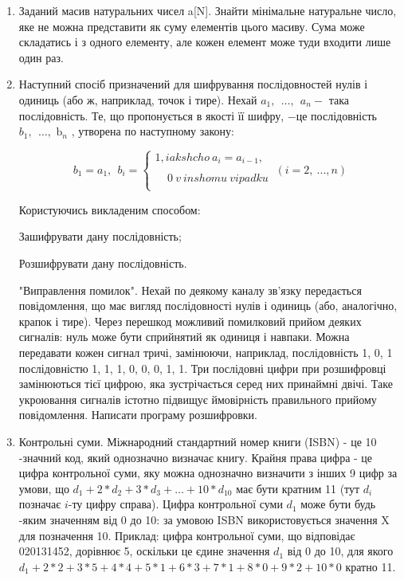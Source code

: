 \documentclass[]{article}
\begin{document}
\begin{enumerate}
\item
Заданий масив натуральних чисел a{[}N{]}. Знайти мінімальне натуральне
число, яке не можна представити як суму елементів цього масиву. Сума
може складатись і з одного елементу, але кожен елемент може туди входити
лише один раз.
\item
Наступний спосіб призначений для шифрування послідовностей нулів і
одиниць (або ж, наприклад, точок і тире). Нехай
\(a_{1},\ \ \ldots,\ \ a_{n} -\) така послідовність. Те, що пропонується
в якості її шифру, \(-\)це послідовність
\(b_{1},\ \ \ldots,\text{\ b}_{n}\) , утворена по наступному закону:


\[b_{1} = a_{1},\ \ b_{i} = \left\{ \begin{matrix}
1,iakshcho\ a_{i} = a_{i - 1}, \\
 \\
\ \ \ \ \ 0\ v\ inshomu\ vipadku \\
\end{matrix} \right.\ \left( i = 2,\ ...,n \right)\]


Користуючись викладеним способом:

Зашифрувати дану послідовність;

Розшифрувати дану послідовність.

"Виправлення помилок". Нехай по деякому каналу зв'язку передається
повідомлення, що має вигляд послідовності нулів і одиниць (або,
аналогічно, крапок і тире). Через перешкод можливий помилковий прийом
деяких сигналів: нуль може бути сприйнятий як одиниця і навпаки. Можна
передавати кожен сигнал тричі, замінюючи, наприклад, послідовність 1, 0,
1 послідовністю 1, 1, 1, 0, 0, 0, 1, 1. Три послідовні цифри при
розшифровці замінюються тієї цифрою, яка зустрічається серед них
принаймні двічі. Таке укроювання сигналів істотно підвищує ймовірність
правильного прийому повідомлення. Написати програму розшифровки.


\item Контрольні суми.
Міжнародний стандартний номер книги (ISBN) - це 10 -значний код, який однозначно визначає книгу.
Крайня права цифра - це цифра контрольної суми, яку можна однозначно визначити з інших 9 цифр за умови,
що $d_{1} + 2*d_{2} + 3*d_{3} + \ldots + 10*d_{10}$ має бути кратним 11 (тут $d_{i}$ позначає $i$-ту цифру справа).
 Цифра контрольної суми $d_1$ може бути будь -яким значенням від 0 до 10:
за умовою ISBN використовується значення X для позначення 10.
Приклад: цифра контрольної суми, що відповідає 020131452, дорівнює 5, оскільки це єдине значення $d_1$ від 0 до 10,
для якого $d_1 + 2*2 + 3*5 + 4*4 + 5*1 + 6*3 + 7*1 + 8*0 + 9*2 + 10*0$ кратно 11.


\end{enumerate}
\end{document}
